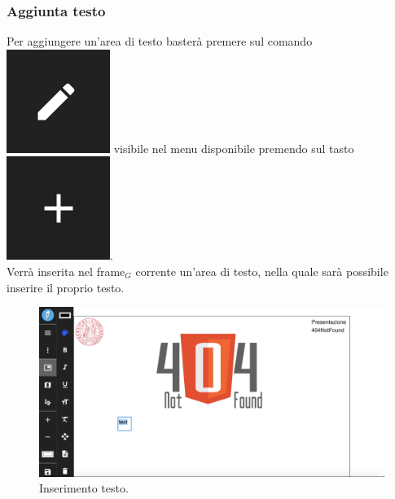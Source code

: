 \subsubsection{Aggiunta testo}
Per aggiungere un'area di testo basterà premere sul comando \includegraphics[scale=0.4]{img/add_text.png} visibile nel menu disponibile premendo sul tasto \includegraphics[scale=0.4]{img/add_object.png}. \\
Verrà inserita nel frame$_G$ corrente un'area di testo, nella quale sarà possibile inserire il proprio testo.

\begin{figure}[!h]
\begin{center}
\includegraphics[scale=0.35]{img/screen_add_text.png}
\caption{Inserimento testo.}
\end{center}
\end{figure}

